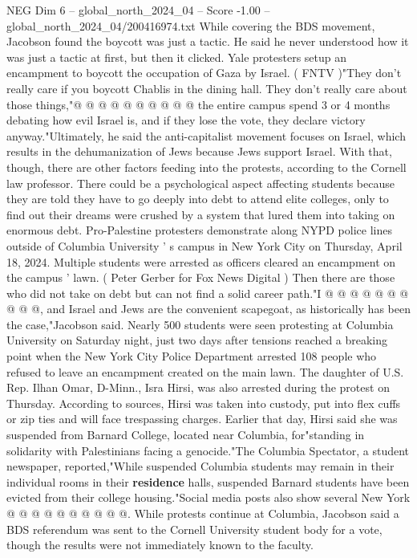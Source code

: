 \begin{textsample}{NEG Dim 6 – global\_north\_2024\_04 – Score -1.00 – global\_north\_2024\_04/200416974.txt}
While covering the BDS movement, Jacobson found the boycott was just a tactic.
He said he never understood how it was just a tactic at first, but then it clicked.
Yale protesters setup an encampment to boycott the occupation of Gaza by Israel. ( FNTV )"They don't really care if you boycott Chablis in the dining hall.
They don't really care about those things,"@ @ @ @ @ @ @ @ @ @ the entire campus spend 3 or 4 months debating how evil Israel is, and if they lose the vote, they declare victory anyway."Ultimately, he said the anti-capitalist movement focuses on Israel, which results in the dehumanization of Jews because Jews support Israel.
With that, though, there are other factors feeding into the protests, according to the Cornell law professor.
There could be a psychological aspect affecting students because they are told they have to go deeply into debt to attend elite colleges, only to find out their dreams were crushed by a system that lured them into taking on enormous debt.
Pro-Palestine protesters demonstrate along NYPD police lines outside of Columbia University ' s campus in New York City on Thursday, April 18, 2024.
Multiple students were arrested as officers cleared an encampment on the campus ' lawn. ( Peter Gerber for Fox News Digital ) Then there are those who did not take on debt but can not find a solid career path."I @ @ @ @ @ @ @ @ @ @, and Israel and Jews are the convenient scapegoat, as historically has been the case,"Jacobson said.
Nearly 500 students were seen protesting at Columbia University on Saturday night, just two days after tensions reached a breaking point when the New York City Police Department arrested 108 people who refused to leave an encampment created on the main lawn.
The daughter of U.S.
Rep.
Ilhan Omar, D-Minn., Isra Hirsi, was also arrested during the protest on Thursday.
According to sources, Hirsi was taken into custody, put into flex cuffs or zip ties and will face trespassing charges.
Earlier that day, Hirsi said she was suspended from Barnard College, located near Columbia, for"standing in solidarity with Palestinians facing a genocide."The Columbia Spectator, a student newspaper, reported,"While suspended Columbia students may remain in their individual rooms in their \textbf{residence} halls, suspended Barnard students have been evicted from their college housing."Social media posts also show several New York @ @ @ @ @ @ @ @ @ @.
While protests continue at Columbia, Jacobson said a BDS referendum was sent to the Cornell University student body for a vote, though the results were not immediately known to the faculty.

\end{textsample}
